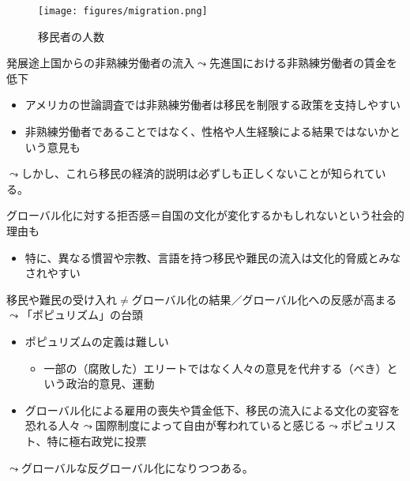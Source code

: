 \documentclass[
  xelatex,
  ja=standard]{bxjsarticle}
\providecommand{\tightlist}{%
  \setlength{\itemsep}{0pt}\setlength{\parskip}{0pt}}\usepackage{longtable,booktabs,array}
\begin{document}
\begin{figure}[htpb]

{\centering \texttt{[image: figures/migration.png]}

}

\caption{移民者の人数}

\end{figure}

発展途上国からの非熟練労働者の流入\(\leadsto\)先進国における非熟練労働者の賃金を低下

\begin{itemize}
\tightlist
\item
  アメリカの世論調査では非熟練労働者は移民を制限する政策を支持しやすい\citep{scheve2001}
\item
  非熟練労働者であることではなく、性格や人生経験による結果ではないかという意見も\citep{hainmueller2014}
\end{itemize}

\(\leadsto\)しかし、これら移民の経済的説明は必ずしも正しくないことが知られている。

グローバル化に対する拒否感＝自国の文化が変化するかもしれないという社会的理由も\citep{margalit2012}

\begin{itemize}
\tightlist
\item
  特に、異なる慣習や宗教、言語を持つ移民や難民の流入は文化的脅威とみなされやすい\citep{hainmueller2014}
\end{itemize}

移民や難民の受け入れ\(\neq\)グローバル化の結果／グローバル化への反感が高まる\(\leadsto\)「ポピュリズム」の台頭

\begin{itemize}
\tightlist
\item
  ポピュリズムの定義は難しい\citep{mudde2004}

  \begin{itemize}
  \tightlist
  \item
    一部の（腐敗した）エリートではなく人々の意見を代弁する（べき）という政治的意見、運動
  \end{itemize}
\item
  グローバル化による雇用の喪失や賃金低下、移民の流入による文化の変容を恐れる人々\(\leadsto\)国際制度によって自由が奪われていると感じる\(\leadsto\)ポピュリスト、特に極右政党に投票\citep{colantone2018, becker2016}
\end{itemize}

\(\leadsto\)グローバルな反グローバル化になりつつある。
\end{document}
